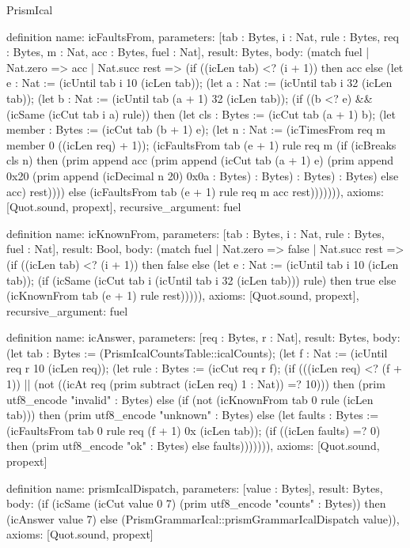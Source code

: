 \begin{lexlean}{PrismIcal}
\begin{semanticmodule}
definition{
  name: icFaultsFrom,
  parameters: [tab : Bytes, i : Nat, rule : Bytes, req : Bytes, m : Nat, acc : Bytes, fuel : Nat],
  result: Bytes,
  body: (match fuel
    | Nat.zero => acc
    | Nat.succ rest => (if ((icLen tab) <? (i + 1)) then acc else (let e : Nat := (icUntil tab i 10 (icLen tab)); (let a : Nat := (icUntil tab i 32 (icLen tab)); (let b : Nat := (icUntil tab (a + 1) 32 (icLen tab)); (if ((b <? e) && (icSame (icCut tab i a) rule)) then (let cls : Bytes := (icCut tab (a + 1) b); (let member : Bytes := (icCut tab (b + 1) e); (let n : Nat := (icTimesFrom req m member 0 ((icLen req) + 1)); (icFaultsFrom tab (e + 1) rule req m (if (icBreaks cls n) then (prim append acc (prim append (icCut tab (a + 1) e) (prim append 0x20 (prim append (icDecimal n 20) 0x0a : Bytes) : Bytes) : Bytes) : Bytes) else acc) rest)))) else (icFaultsFrom tab (e + 1) rule req m acc rest))))))),
  axioms: [Quot.sound, propext],
  recursive_argument: fuel
}

definition{
  name: icKnownFrom,
  parameters: [tab : Bytes, i : Nat, rule : Bytes, fuel : Nat],
  result: Bool,
  body: (match fuel
    | Nat.zero => false
    | Nat.succ rest => (if ((icLen tab) <? (i + 1)) then false else (let e : Nat := (icUntil tab i 10 (icLen tab)); (if (icSame (icCut tab i (icUntil tab i 32 (icLen tab))) rule) then true else (icKnownFrom tab (e + 1) rule rest))))),
  axioms: [Quot.sound, propext],
  recursive_argument: fuel
}

definition{
  name: icAnswer,
  parameters: [req : Bytes, r : Nat],
  result: Bytes,
  body: (let tab : Bytes := (PrismIcalCountsTable::icalCounts); (let f : Nat := (icUntil req r 10 (icLen req)); (let rule : Bytes := (icCut req r f); (if (((icLen req) <? (f + 1)) || (not ((icAt req (prim subtract (icLen req) 1 : Nat)) =? 10))) then (prim utf8_encode "invalid" : Bytes) else (if (not (icKnownFrom tab 0 rule (icLen tab))) then (prim utf8_encode "unknown\n" : Bytes) else (let faults : Bytes := (icFaultsFrom tab 0 rule req (f + 1) 0x (icLen tab)); (if ((icLen faults) =? 0) then (prim utf8_encode "ok\n" : Bytes) else faults))))))),
  axioms: [Quot.sound, propext]
}

definition{
  name: prismIcalDispatch,
  parameters: [value : Bytes],
  result: Bytes,
  body: (if (icSame (icCut value 0 7) (prim utf8_encode "counts\n" : Bytes)) then (icAnswer value 7) else (PrismGrammarIcal::prismGrammarIcalDispatch value)),
  axioms: [Quot.sound, propext]
}
\end{semanticmodule}
\end{lexlean}
